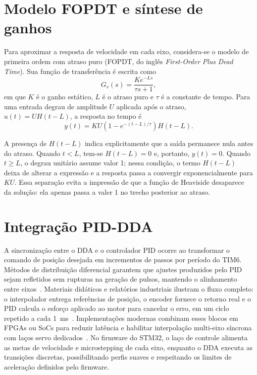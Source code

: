 \section{Modelo FOPDT e síntese de ganhos}
\label{sec:fopdt}

Para aproximar a resposta de velocidade em cada eixo, considera-se o
modelo de primeira ordem com atraso puro (FOPDT, do inglês
\emph{First-Order Plus Dead Time}). Sua função de transferência é
escrita como
\begin{equation}
    G_v(s)=\frac{K e^{-Ls}}{\tau s+1},
\end{equation}
em que $K$ é o ganho estático, $L$ é o atraso puro e $\tau$ é a constante
de tempo. Para uma entrada degrau de amplitude $U$ aplicada após o atraso,
$u(t)=UH(t-L)$, a resposta no tempo é
\begin{equation}
    y(t)=KU\left(1-e^{-(t-L)/\tau}\right)H(t-L).
\end{equation}

A presença de $H(t-L)$ indica explicitamente que a saída permanece nula
antes do atraso. Quando $t<L$, tem-se $H(t-L)=0$ e, portanto, $y(t)=0$.
Quando $t\geq L$, o degrau unitário assume valor 1; nessa condição, o
termo $H(t-L)$ deixa de alterar a expressão e a resposta passa a convergir
exponencialmente para $KU$. Essa separação evita a impressão de que a
função de Heaviside desaparece da solução: ela apenas passa a valer 1 no
trecho posterior ao atraso.

\section{Integração PID-DDA}

A sincronização entre o DDA e o controlador PID ocorre ao transformar o
comando de posição desejada em incrementos de passos por período do TIM6.
Métodos de distribuição diferencial garantem que ajustes produzidos pelo
PID sejam refletidos sem rupturas na geração de pulsos, mantendo o
alinhamento entre eixos~\cite{mori2005dda,efficient_reference}. Materiais
didáticos e relatórios industriais ilustram o fluxo completo: o
interpolador entrega referências de posição, o encoder fornece o retorno
real e o PID calcula o esforço aplicado ao motor para cancelar o erro, em
um ciclo repetido a cada \SI{1}{\milli\second}~\cite{idc_cnc_interp,unit3_interpolators}.
Implementações modernas combinam esses blocos em FPGAs ou SoCs para
reduzir latência e habilitar interpolação multi-eixo síncrona com laços
servo dedicados~\cite{kung_fpga_motion,real_time_interpolators}. No
firmware do STM32, o laço de controle alimenta as metas de velocidade e
microstepping de cada eixo, enquanto o DDA executa as transições
discretas, possibilitando perfis suaves e respeitando os limites de
aceleração definidos pelo firmware.


